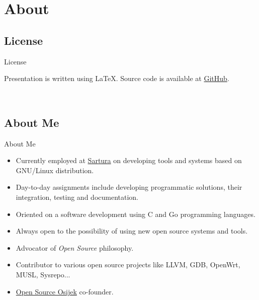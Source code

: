 \section*{About}

\subsection*{License}
\begin{frame}{License}
    \begin{center}
        Presentation is written using \LaTeX. Source code is available at \href{https://github.com/hvarga/openwrt-application-development}{GitHub}.
    \end{center}
    \vfill
    \begin{center}
        \doclicenseImage
        \\
        \doclicenseLongText
    \end{center}
\end{frame}


\subsection*{About Me}
\begin{frame}{About Me}
    \pause
    \begin{itemize}[<+-|alert@+>]
        \item Currently employed at \href{http://www.sartura.hr/}{Sartura} on developing tools and systems based on GNU/Linux distribution.
        \item Day-to-day assignments include developing programmatic solutions, their integration, testing and documentation.
        \item Oriented on a software development using C and Go programming languages.
        \item Always open to the possibility of using new open source systems and tools.
        \item Advocator of \textit{Open Source} philosophy.
        \item Contributor to various open source projects like LLVM, GDB, OpenWrt, MUSL, Sysrepo...
        \item \href{https://www.opensource-osijek.org}{Open Source Osijek} co-founder.
    \end{itemize}
\end{frame}

